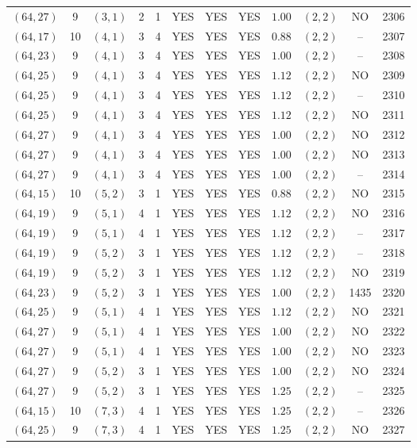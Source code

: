 \begin{longtable}{|c|c|c|c|c|c|c|c|c|c|c|c|}
$(64,27)$ & 9 & $(3,1)$ & 2 & 1 & YES & YES & YES & $1.00$ & $(2,2)$ & NO & 2306\\
$(64,17)$ & 10 & $(4,1)$ & 3 & 4 & YES & YES & YES & $0.88$ & $(2,2)$ & -- & 2307\\
$(64,23)$ & 9 & $(4,1)$ & 3 & 4 & YES & YES & YES & $1.00$ & $(2,2)$ & -- & 2308\\
$(64,25)$ & 9 & $(4,1)$ & 3 & 4 & YES & YES & YES & $1.12$ & $(2,2)$ & NO & 2309\\
$(64,25)$ & 9 & $(4,1)$ & 3 & 4 & YES & YES & YES & $1.12$ & $(2,2)$ & -- & 2310\\
$(64,25)$ & 9 & $(4,1)$ & 3 & 4 & YES & YES & YES & $1.12$ & $(2,2)$ & NO & 2311\\
$(64,27)$ & 9 & $(4,1)$ & 3 & 4 & YES & YES & YES & $1.00$ & $(2,2)$ & NO & 2312\\
$(64,27)$ & 9 & $(4,1)$ & 3 & 4 & YES & YES & YES & $1.00$ & $(2,2)$ & NO & 2313\\
$(64,27)$ & 9 & $(4,1)$ & 3 & 4 & YES & YES & YES & $1.00$ & $(2,2)$ & -- & 2314\\
$(64,15)$ & 10 & $(5,2)$ & 3 & 1 & YES & YES & YES & $0.88$ & $(2,2)$ & NO & 2315\\
$(64,19)$ & 9 & $(5,1)$ & 4 & 1 & YES & YES & YES & $1.12$ & $(2,2)$ & NO & 2316\\
$(64,19)$ & 9 & $(5,1)$ & 4 & 1 & YES & YES & YES & $1.12$ & $(2,2)$ & -- & 2317\\
$(64,19)$ & 9 & $(5,2)$ & 3 & 1 & YES & YES & YES & $1.12$ & $(2,2)$ & -- & 2318\\
$(64,19)$ & 9 & $(5,2)$ & 3 & 1 & YES & YES & YES & $1.12$ & $(2,2)$ & NO & 2319\\
$(64,23)$ & 9 & $(5,2)$ & 3 & 1 & YES & YES & YES & $1.00$ & $(2,2)$ & 1435 & 2320\\
$(64,25)$ & 9 & $(5,1)$ & 4 & 1 & YES & YES & YES & $1.12$ & $(2,2)$ & NO & 2321\\
$(64,27)$ & 9 & $(5,1)$ & 4 & 1 & YES & YES & YES & $1.00$ & $(2,2)$ & NO & 2322\\
$(64,27)$ & 9 & $(5,1)$ & 4 & 1 & YES & YES & YES & $1.00$ & $(2,2)$ & NO & 2323\\
$(64,27)$ & 9 & $(5,2)$ & 3 & 1 & YES & YES & YES & $1.00$ & $(2,2)$ & NO & 2324\\
$(64,27)$ & 9 & $(5,2)$ & 3 & 1 & YES & YES & YES & $1.25$ & $(2,2)$ & -- & 2325\\
$(64,15)$ & 10 & $(7,3)$ & 4 & 1 & YES & YES & YES & $1.25$ & $(2,2)$ & -- & 2326\\
$(64,25)$ & 9 & $(7,3)$ & 4 & 1 & YES & YES & YES & $1.25$ & $(2,2)$ & NO & 2327\\

\end{longtable}

